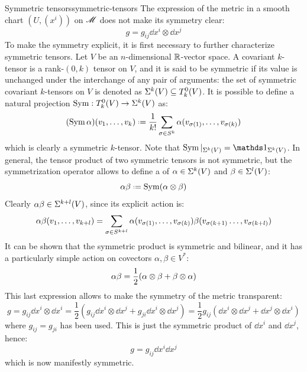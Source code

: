 \begin{observation}{Symmetric tensors}{symmetric-tensors}
  The expression of the metric in a smooth chart $ (U,(x^i)) $ on $ \mathscr{M} $ does not make its symmetry clear:
  \begin{equation*}
    g = g_{ij} \dd x^i \otimes \dd x^j
  \end{equation*}
  To make the symmetry explicit, it is first necessary to further characterize symmetric tensors. Let $ V $ be an $ n $-dimensional $ \mathbb{R} $-vector space. A covariant $ k $-tensor is a rank-$ (0,k) $ tensor on $ V $, and it is said to be symmetric if its value is unchanged under the interchange of any pair of arguments: the set of symmetric covariant $ k $-tensors on $ V $ is denoted as $ {\Sigma}^{k}(V) \subseteq T^0_k(V) $. It is possible to define a natural projection $ \operatorname{Sym} : T^0_k(V) \rightarrow {\Sigma}^{k}(V) $ as:
  \begin{equation}
    (\Sym \alpha)(v_1 , \dots , v_k) \defeq \frac{1}{k!} \sum_{\sigma \in \sy{k}} \alpha(v_{\sigma(1)} , \dots , v_{\sigma(k)})
  \end{equation}
  which is clearly a symmetric $ k $-tensor. Note that $ \Sym \vert_{\sv{k}(V)} = \id_{\sv{k}(V)} $. In general, the tensor product of two symmetric tensors is not symmetric, but the symmetrization operator allows to define a  of $ \alpha \in {\Sigma}^{k}(V) $ and $ \beta \in {\Sigma}^{l}(V) $:
  \begin{equation}
    \alpha \spr \beta \defeq \Sym(\alpha \otimes \beta)
  \end{equation}
  Clearly $ \alpha  \beta \in {\Sigma}^{k+l}(V) $, since its explicit action is:
  \begin{equation}
    \alpha  \beta(v_1 , \dots , v_{k+l}) = \sum_{\sigma \in S^{k+l}} \alpha(v_{\sigma(1)} , \dots , v_{\sigma(k)}) \beta(v_{\sigma(k+1)} \dots , v_{\sigma(k+l)})
  \end{equation}
  It can be shown that the symmetric product is symmetric and bilinear, and it has a particularly simple action on covectors $ \alpha , \beta \in V^* $:
  \begin{equation}
    \alpha  \beta = \frac{1}{2} (\alpha \otimes \beta + \beta \otimes \alpha)
  \end{equation}
  This last expression allows to make the symmetry of the metric transparent:
  \begin{equation*}
    g = g_{ij} \dd x^i \otimes \dd x^i = \frac{1}{2} (g_{ij} \dd x^i \otimes \dd x^j + g_{ji} \dd x^i \otimes \dd x^j) = \frac{1}{2} g_{ij} (\dd x^i \otimes \dd x^j + \dd x^j \otimes \dd x^i)
  \end{equation*}
  where $ g_{ij} = g_{ji} $ has been used. This is just the symmetric product of $ \dd x^i $ and $ \dd x^j $, hence:
  \begin{equation}
    g = g_{ij} \dd x^i \dd x^j
  \end{equation}
  which is now manifestly symmetric.
\end{observation}

